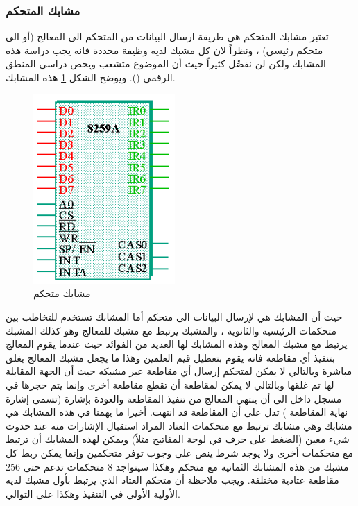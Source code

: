 \documentclass[document.tex]{subfiles}
\begin{document}
\subsubsection{مشابك المتحكم }
تعتبر مشابك المتحكم هي  طريقة ارسال البيانات من المتحكم الى المعالج (أو الى متحكم رئيسي) ، ونظراً لان كل مشبك لديه وظيفة محددة فانه يجب دراسة هذه المشابك ولكن لن نفصِّل كثيراً حيث أن الموضوع متشعب ويخص دراسي المنطق الرقمي (). ويوضح الشكل \ref{fig:pic_pins} هذه المشابك.

\begin{figure}
  \vspace{-20pt}
  \begin{center}
    \includegraphics[width=0.48\textwidth]{../img/pic_pins}
  \end{center}
  \vspace{-20pt}
  \caption{مشابك متحكم }
  \vspace{-10pt}
\label{fig:pic_pins} 
\end{figure}

حيث أن المشابك  هي لإرسال البيانات الى متحكم  أما المشابك  تستخدم للتخاطب بين متحكمات  الرئيسية والثانوية ، والمشبك  يرتبط مع مشبك للمعالج وهو  كذلك المشبك  يرتبط مع مشبك المعالج  وهذه المشابك لها العديد من الفوائد حيث عندما يقوم المعالج بتنفيذ أي مقاطعة فانه يقوم بتعطيل قيم العلمين  وهذا ما يجعل مشبك المعالج  يغلق مباشرة وبالتالي لا يمكن لمتحكم  إرسال أي مقاطعة عبر مشبكه  حيث أن الجهة المقابلة لها تم غلقها وبالتالي لا يمكن لمقاطعة أن تقطع مقاطعة أخرى وإنما يتم حجرها في مسجل داخل  الى أن ينتهي المعالج من تنفيذ المقاطعة والعودة بإشارة (تسمى إشارة نهاية المقاطعة ) تدل على أن المقاطعة قد انتهت. أخيرا ما يهمنا في هذه المشابك هي مشابك  وهي مشابك ترتبط مع متحكمات العتاد المراد استقبال الإشارات منه عند حدوث شيء معين (الضغط على حرف في لوحة المفاتيح مثلاً) ويمكن لهذه المشابك أن ترتبط مع متحكمات  أخرى ولا يوجد شرط ينص على وجوب توفر متحكمين  وإنما يمكن ربط كل مشبك من هذه المشابك الثمانية مع متحكم  وهكذا سيتواجد 8 متحكمات تدعم حتى 256 مقاطعة عتادية مختلفة. ويجب ملاحظة أن متحكم العتاد الذي يرتبط بأول مشبك  لديه الأولية الأولى في التنفيذ وهكذا على التوالي.\\
\end{document}
